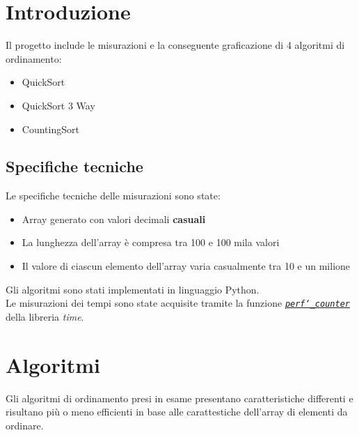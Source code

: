 \documentclass[a4paper, 11pt]{article}
\newcommand{\myfrontpage}{%
  \begin{titlepage}
  \centering
  \preparefrontpage
  \end{titlepage}
}
\begin{document}
\myfrontpage

\thispagestyle{empty} 

\newpage

\tableofcontents
\newpage
\section{Introduzione}
Il progetto include le misurazioni e la conseguente graficazione di 4 algoritmi di ordinamento:
\begin{itemize}
    \item QuickSort
    \item QuickSort 3 Way
    \item CountingSort
\end{itemize}
\subsection{Specifiche tecniche}
Le specifiche tecniche delle misurazioni sono state:
\begin{itemize}
    \item Array generato con valori decimali \textbf{casuali}
    \item La lunghezza dell'array è compresa tra 100 e 100 mila valori
    \item Il valore di ciascun elemento dell'array varia casualmente tra 10 e un milione
\end{itemize}
Gli algoritmi sono stati implementati in linguaggio Python. \\
Le misurazioni dei tempi sono state acquisite tramite la funzione \href{https://docs.python.org/3/library/time.html#time.perf_counter}{\textit{\texttt{perf\char`_counter}}} della libreria \textit{time}.

\section{Algoritmi}
Gli algoritmi di ordinamento presi in esame presentano caratteristiche differenti e risultano più o meno efficienti in base alle carattestiche dell'array di elementi da ordinare.
\end{document}
